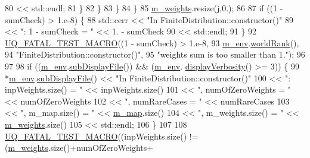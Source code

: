 \begin{DoxyCode}
80                                    << std::endl;
81         \}
82       \}
83     \}
84   \}
85   \hyperlink{class_q_u_e_s_o_1_1_finite_distribution_a37ce51dce9fa6b755277281d6dd7c052}{m\_weights}.resize(j,0.);
86 
87   \textcolor{keywordflow}{if} ((1 - sumCheck) > 1.e-8) \{
88     std::cerr << \textcolor{stringliteral}{"In FiniteDistribution::constructor()"}
89               << \textcolor{stringliteral}{": 1 - sumCheck = "} << 1. - sumCheck
90               << std::endl;
91   \}
92   \hyperlink{_defines_8h_a56d63d18d0a6d45757de47fcc06f574d}{UQ\_FATAL\_TEST\_MACRO}((1 - sumCheck) > 1.e-8,
93                       \hyperlink{class_q_u_e_s_o_1_1_finite_distribution_a1e3d075444dbb96d4d31b51a7eafed41}{m\_env}.\hyperlink{class_q_u_e_s_o_1_1_base_environment_a78b57112bbd0e6dd0e8afec00b40ffa7}{worldRank}(),
94                       \textcolor{stringliteral}{"FiniteDistribution::constructor()"},
95                       \textcolor{stringliteral}{"weights sum is too smaller than 1."});
96 
97 
98   \textcolor{keywordflow}{if} ((\hyperlink{class_q_u_e_s_o_1_1_finite_distribution_a1e3d075444dbb96d4d31b51a7eafed41}{m\_env}.\hyperlink{class_q_u_e_s_o_1_1_base_environment_a8a0064746ae8dddfece4229b9ad374d6}{subDisplayFile}()) && (\hyperlink{class_q_u_e_s_o_1_1_finite_distribution_a1e3d075444dbb96d4d31b51a7eafed41}{m\_env}.
      \hyperlink{class_q_u_e_s_o_1_1_base_environment_a1fe5f244fc0316a0ab3e37463f108b96}{displayVerbosity}() >= 3)) \{
99     *\hyperlink{class_q_u_e_s_o_1_1_finite_distribution_a1e3d075444dbb96d4d31b51a7eafed41}{m\_env}.\hyperlink{class_q_u_e_s_o_1_1_base_environment_a8a0064746ae8dddfece4229b9ad374d6}{subDisplayFile}() << \textcolor{stringliteral}{"In FiniteDistribution::constructor()"}
100                             << \textcolor{stringliteral}{": inpWeights.size() = "} << inpWeights.size()
101                             << \textcolor{stringliteral}{", numOfZeroWeights = "}  << numOfZeroWeights
102                             << \textcolor{stringliteral}{", numRareCases = "}      << numRareCases
103                             << \textcolor{stringliteral}{", m\_map.size() = "}      << \hyperlink{class_q_u_e_s_o_1_1_finite_distribution_a7b0ba94a9f10793519056eaf612cbeb1}{m\_map}.size()
104                             << \textcolor{stringliteral}{", m\_weights.size() = "}  << \hyperlink{class_q_u_e_s_o_1_1_finite_distribution_a37ce51dce9fa6b755277281d6dd7c052}{m\_weights}.size()
105                             << std::endl;
106   \}
107 
108   \hyperlink{_defines_8h_a56d63d18d0a6d45757de47fcc06f574d}{UQ\_FATAL\_TEST\_MACRO}((inpWeights.size() != (\hyperlink{class_q_u_e_s_o_1_1_finite_distribution_a37ce51dce9fa6b755277281d6dd7c052}{m\_weights}.size()+numOfZeroWeights+

\end{DoxyCode}
